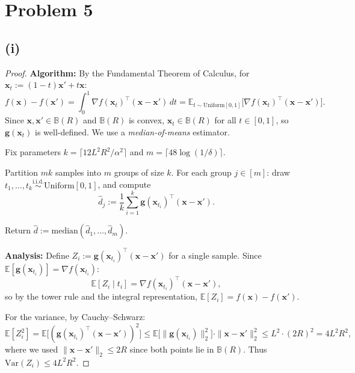 \section*{Problem 5}
\subsection*{(i)}

\begin{proof}
\textbf{Algorithm:}
By the Fundamental Theorem of Calculus, for $\mathbf{x}_t := (1-t)\mathbf{x}' + t\mathbf{x}$:
\[
f(\mathbf{x}) - f(\mathbf{x}') = \int_0^1 \nabla f(\mathbf{x}_t)^\top (\mathbf{x} - \mathbf{x}')\,dt = \mathbb{E}_{t \sim \mathrm{Uniform}[0,1]}\bigl[\nabla f(\mathbf{x}_t)^\top (\mathbf{x} - \mathbf{x}')\bigr].
\]
Since $\mathbf{x}, \mathbf{x}' \in \mathbb{B}(R)$ and $\mathbb{B}(R)$ is convex, $\mathbf{x}_t \in \mathbb{B}(R)$ for all $t \in [0,1]$, so $\mathbf{g}(\mathbf{x}_t)$ is well-defined. We use a \emph{median-of-means} estimator.

Fix parameters $k = \lceil 12L^2R^2/\alpha^2 \rceil$ and $m = \lceil 48\log(1/\delta) \rceil$.

Partition $mk$ samples into $m$ groups of size $k$. For each group $j \in [m]$: draw $t_1, \ldots, t_k \stackrel{\text{i.i.d.}}{\sim} \mathrm{Uniform}[0,1]$, and compute
\[
\hat{d}_j := \frac{1}{k}\sum_{i=1}^{k} \mathbf{g}(\mathbf{x}_{t_i})^\top (\mathbf{x} - \mathbf{x}').
\]

Return $\hat{d} := \mathrm{median}(\hat{d}_1, \ldots, \hat{d}_m)$.

\medskip
\textbf{Analysis:}
Define $Z_i := \mathbf{g}(\mathbf{x}_{t_i})^\top (\mathbf{x} - \mathbf{x}')$ for a single sample. Since $\mathbb{E}[\mathbf{g}(\mathbf{x}_{t_i})] = \nabla f(\mathbf{x}_{t_i})$:
\[
\mathbb{E}[Z_i \mid t_i] = \nabla f(\mathbf{x}_{t_i})^\top (\mathbf{x} - \mathbf{x}'),
\]
so by the tower rule and the integral representation, $\mathbb{E}[Z_i] = f(\mathbf{x}) - f(\mathbf{x}')$.

For the variance, by Cauchy--Schwarz:
\[
\mathbb{E}[Z_i^2] = \mathbb{E}\bigl[(\mathbf{g}(\mathbf{x}_{t_i})^\top (\mathbf{x} - \mathbf{x}'))^2\bigr] \leq \mathbb{E}\bigl[\|\mathbf{g}(\mathbf{x}_{t_i})\|_2^2\bigr] \cdot \|\mathbf{x} - \mathbf{x}'\|_2^2 \leq L^2 \cdot (2R)^2 = 4L^2R^2,
\]
where we used $\|\mathbf{x} - \mathbf{x}'\|_2 \leq 2R$ since both points lie in $\mathbb{B}(R)$. Thus $\mathrm{Var}(Z_i) \leq 4L^2R^2$.


\end{proof}
